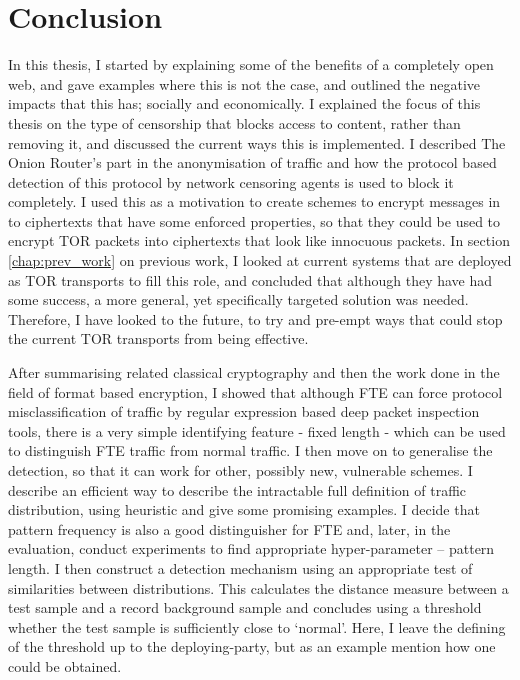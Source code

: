 \documentclass[ %
                    author={Samuel Russell},
                supervisor={Prof. Bogdan Warinschi},
                    degree={MEng},
                     title={Innocuous Ciphertexts},
                  subtitle={The DE-CENSOR Scheme},
                      type={Research},
                      year={2018} ]{dissertation}
\begin{document}

\chapter{Conclusion}
\label{chap:conclusion}


In this thesis, I started by explaining some of the benefits of a completely open web, and gave examples where this is not the case, and outlined the negative impacts that this has; socially and economically.
I explained the focus of this thesis on the type of censorship that blocks access to content, rather than removing it, and discussed the current ways this is implemented.
I described The Onion Router's part in the anonymisation of traffic and how the protocol based detection of this protocol by network censoring agents is used to block it completely.
I used this as a motivation to create schemes to encrypt messages in to ciphertexts that have some enforced properties, so that they could be used to encrypt TOR packets into ciphertexts that look like innocuous packets.
In section \ref{chap:prev_work} on previous work, I looked at current systems that are deployed as TOR transports to fill this role, and concluded that although they have had some success, a more general, yet specifically targeted solution was needed.
Therefore, I have looked to the future, to try and pre-empt ways that could stop the current TOR transports from being effective.

After summarising related classical cryptography and then the work done in the field of format based encryption, I showed that although FTE can force protocol misclassification of traffic by regular expression based deep packet inspection tools, there is a very simple identifying feature - fixed length - which can be used to distinguish FTE traffic from normal traffic.
I then move on to generalise the detection, so that it can work for other, possibly new, vulnerable schemes.
I describe an efficient way to describe the intractable full definition of traffic distribution, using heuristic and give some promising examples.
I decide that pattern frequency is also a good distinguisher for FTE and, later, in the evaluation, conduct experiments to find appropriate hyper-parameter -- pattern length.
I then construct a detection mechanism using an appropriate test of similarities between distributions.
This calculates the distance measure between a test sample and a record background sample and concludes using a threshold whether the test sample is sufficiently close to `normal'.
Here, I leave the defining of the threshold up to the deploying-party, but as an example mention how one could be obtained.
\end{document}
